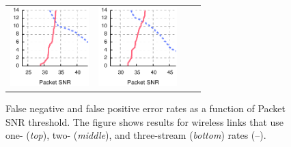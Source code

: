 \begin{figure}[p]
\begin{leftfullpage}
\begin{tabular}{cccc}
	\includegraphics[height=1.2in]{figures/delivery/goodbad/packet_snr_goodbad_22.pdf} &
	\includegraphics[height=1.2in]{figures/delivery/goodbad/packet_snr_goodbad_23.pdf}
	\end{tabular}

	\caption[Thresholds and False Negative/Positive Rates with Packet SNR]{\label{fig:packet_snr_goodbad}False negative and false positive error rates as a function of Packet SNR threshold. The figure shows results for wireless links that use one- (\emph{top}), two- (\emph{middle}), and three-stream (\emph{bottom}) rates (--).}
	\end{leftfullpage}
\end{figure}

